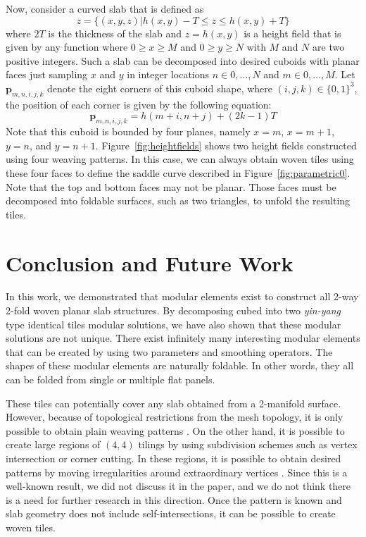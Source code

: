 \documentclass[times,twocolumn,final]{elsarticle}
\begin{document}
Now, consider a curved slab that is defined as 
$$z=\{ (x,y,z) | h(x,y) - T \leq z \leq h(x,y) + T\}$$
where $2T$ is the thickness of the slab and $z=h(x,y)$ is a height field that is given by any function where $0 \geq x \geq M$ and $0 \geq y \geq N$ with $M$ and $N$ are two positive integers. Such a slab can be decomposed into desired cuboids with planar faces just sampling $x$ and $y$ in integer locations $n \in {0,\ldots, N}$ and $m \in {0,\ldots, M}$. Let $\textbf{p}_{m,n,i,j,k}$ denote the eight corners of this cuboid shape, where $(i,j,k) \in \{0,1\}^3$, the position of each corner is given by the following equation: 
$$\textbf{p}_{m,n,i,j,k}= h(m+i,n+j) +  (2k-1) T $$
Note that this cuboid is bounded by four planes, namely $x=m$, $x=m+1$, $y=n$, and $y=n+1$. Figure~\ref{fig:heightfields} shows two height fields constructed using four weaving patterns. In this case, we can always obtain woven tiles using these four faces to define the saddle curve described in Figure~\ref{fig:parametric0}. Note that the top and bottom faces may not be planar. Those faces must be decomposed into foldable surfaces, such as two triangles, to unfold the resulting tiles.



\section{Conclusion and Future Work}

In this work, we demonstrated that modular elements exist to construct all 2-way 2-fold woven planar slab structures. By decomposing cubed into two \textit{yin-yang} type identical tiles modular solutions, we have also shown that these modular solutions are not unique. There exist infinitely many interesting modular elements that can be created by using two parameters and smoothing operators. The shapes of these modular elements are naturally foldable. In other words, they all can be folded from single or multiple flat panels. 

These tiles can potentially cover any slab obtained from a 2-manifold surface. However, because of topological restrictions from the mesh topology, it is only possible to obtain plain weaving patterns \cite{akleman2009cyclic,akleman2015extended,akleman2020topologically}. On the other hand, it is possible to create large regions of $(4,4)$ tilings by using subdivision schemes such as vertex intersection or corner cutting. In these regions, it is possible to obtain desired patterns by moving irregularities around extraordinary vertices \cite{akleman2011cyclic}. Since this is a well-known result, we did not discuss it in the paper, and we do not think there is a need for further research in this direction. Once the pattern is known and slab geometry does not include self-intersections, it can be possible to create woven tiles. 
\end{document}

